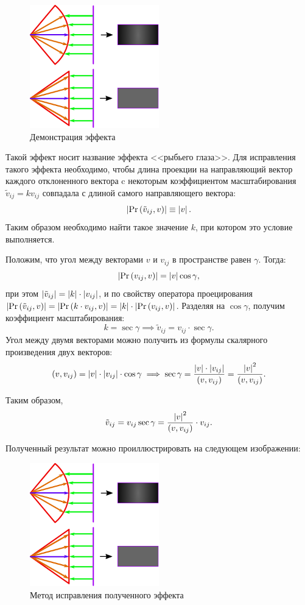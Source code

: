 	\begin{figure}[H]
		\centering
		\includegraphics[width=0.5\textwidth]{additional/fisheye1.pdf}
		\caption{Демонстрация эффекта}
	\end{figure}

	Такой эффект носит название эффекта <<рыбьего глаза>>. Для исправления такого эффекта необходимо, чтобы длина проекции на направляющий вектор каждого отклоненного вектора c некоторым коэффициентом масштабирования \( \tilde{v}_{ij} = k v_{ij} \) совпадала с длиной самого направляющего вектора:
	\[ \left\vert \Pr\left( \tilde{v}_{ij}, v \right) \right\vert \equiv \left\vert v \right\vert. \]
	Таким образом необходимо найти такое значение $k$, при котором это условие выполняется.

	Положим, что угол между векторами $v$ и \( v_{ij} \) в пространстве равен \( \gamma \). Тогда:
	\[ \left\vert \Pr\left( v_{ij}, v \right) \right\vert = \left\vert v \right\vert \cos{\gamma}, \]
	при этом
	\( \left\vert \tilde{v}_{ij} \right\vert = \left\vert k \right\vert \cdot \left\vert v_{ij} \right\vert \), и по свойству оператора проецирования \( \left\vert \Pr\left( \tilde{v}_{ij}, v \right) \right\vert = \left\vert \Pr\left( k \cdot v_{ij}, v \right) \right\vert = \left\vert k \right\vert \cdot \left\vert \Pr\left( v_{ij}, v \right) \right\vert \). Разделяя на \( \cos{\gamma} \), получим коэффициент масштабирования:
	\[ k = \sec{\gamma} \implies \tilde{v}_{ij} = v_{ij} \cdot \sec{\gamma}. \]
	Угол между двумя векторами можно получить из формулы скалярного произведения двух векторов:
	\[ \left( v, v_{ij} \right) = \left\vert v \right\vert \cdot \left\vert v_{ij} \right\vert \cdot \cos{\gamma} \implies \sec{\gamma} = \frac{\left\vert v \right\vert \cdot \left\vert v_{ij} \right\vert}{\left( v, v_{ij} \right)} = \frac{\left\vert v \right\vert^2}{\left( v, v_{ij} \right)}. \]

	Таким образом,
	\[ \tilde{v}_{ij} = v_{ij} \sec{\gamma} = \frac{\left\vert v \right\vert^2}{\left( v, v_{ij} \right)} \cdot v_{ij}. \]

	Полученный результат можно проиллюстрировать на следующем изображении:
	\begin{figure}[H]
		\centering
		\includegraphics[width=0.5\textwidth]{additional/fisheye2.pdf}
		\caption{Метод исправления полученного эффекта}
	\end{figure}

